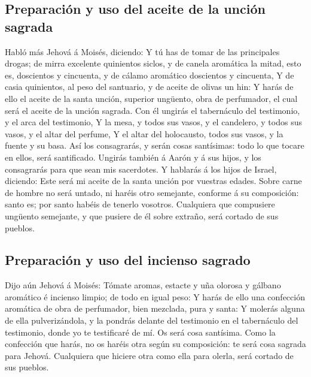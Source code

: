 \hypertarget{preparaciuxf3n-y-uso-del-aceite-de-la-unciuxf3n-sagrada}{%
\subsection{Preparación y uso del aceite de la unción
sagrada}\label{preparaciuxf3n-y-uso-del-aceite-de-la-unciuxf3n-sagrada}}

 Habló más Jehová á Moisés, diciendo:  Y
tú has de tomar de las principales drogas; de mirra excelente quinientos
siclos, y de canela aromática la mitad, esto es, doscientos y cincuenta,
y de cálamo aromático doscientos y cincuenta,  Y de casia
quinientos, al peso del santuario, y de aceite de olivas un hin:
 Y harás de ello el aceite de la santa unción, superior
ungüento, obra de perfumador, el cual será el aceite de la unción
sagrada.  Con él ungirás el tabernáculo del testimonio, y
el arca del testimonio,  Y la mesa, y todos sus vasos, y
el candelero, y todos sus vasos, y el altar del perfume, 
Y el altar del holocausto, todos sus vasos, y la fuente y su basa.
 Así los consagrarás, y serán cosas santísimas: todo lo
que tocare en ellos, será santificado.  Ungirás también á
Aarón y á sus hijos, y los consagrarás para que sean mis sacerdotes.
 Y hablarás á los hijos de Israel, diciendo: Este será mi
aceite de la santa unción por vuestras edades.  Sobre
carne de hombre no será untado, ni haréis otro semejante, conforme á su
composición: santo es; por santo habéis de tenerlo vosotros.
 Cualquiera que compusiere ungüento semejante, y que
pusiere de él sobre extraño, será cortado de sus pueblos.

\hypertarget{preparaciuxf3n-y-uso-del-incienso-sagrado}{%
\subsection{Preparación y uso del incienso
sagrado}\label{preparaciuxf3n-y-uso-del-incienso-sagrado}}

 Dijo aún Jehová á Moisés: Tómate aromas, estacte y uña
olorosa y gálbano aromático é incienso limpio; de todo en igual peso:
 Y harás de ello una confección aromática de obra de
perfumador, bien mezclada, pura y santa:  Y molerás
alguna de ella pulverizándola, y la pondrás delante del testimonio en el
tabernáculo del testimonio, donde yo te testificaré de mí. Os será cosa
santísima.  Como la confección que harás, no os haréis
otra según su composición: te será cosa sagrada para Jehová.
 Cualquiera que hiciere otra como ella para olerla, será
cortado de sus pueblos.

